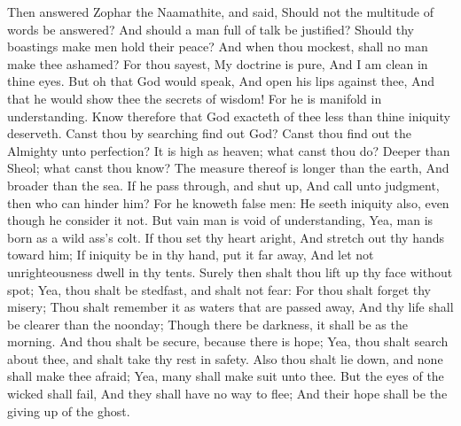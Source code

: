 Then answered Zophar the Naamathite, and said,  Should not the multitude of words be answered? And should a man full of talk be justified?  Should thy boastings make men hold their peace? And when thou mockest, shall no man make thee ashamed?  For thou sayest, My doctrine is pure, And I am clean in thine eyes.  But oh that God would speak, And open his lips against thee,  And that he would show thee the secrets of wisdom! For he is manifold in understanding. Know therefore that God exacteth of thee less than thine iniquity deserveth.  Canst thou by searching find out God? Canst thou find out the Almighty unto perfection?  It is high as heaven; what canst thou do? Deeper than Sheol; what canst thou know?  The measure thereof is longer than the earth, And broader than the sea.  If he pass through, and shut up, And call unto judgment, then who can hinder him?  For he knoweth false men: He seeth iniquity also, even though he consider it not.  But vain man is void of understanding, Yea, man is born as a wild ass’s colt.  If thou set thy heart aright, And stretch out thy hands toward him;  If iniquity be in thy hand, put it far away, And let not unrighteousness dwell in thy tents.  Surely then shalt thou lift up thy face without spot; Yea, thou shalt be stedfast, and shalt not fear:  For thou shalt forget thy misery; Thou shalt remember it as waters that are passed away,  And thy life shall be clearer than the noonday; Though there be darkness, it shall be as the morning.  And thou shalt be secure, because there is hope; Yea, thou shalt search about thee, and shalt take thy rest in safety.  Also thou shalt lie down, and none shall make thee afraid; Yea, many shall make suit unto thee.  But the eyes of the wicked shall fail, And they shall have no way to flee; And their hope shall be the giving up of the ghost. 

